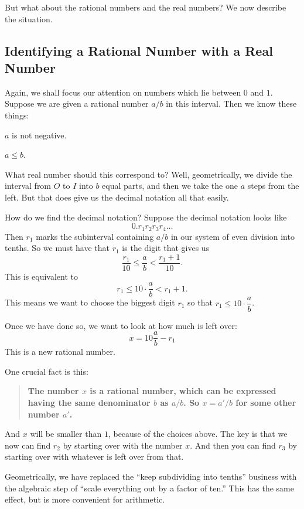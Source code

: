 \documentclass[12pt,letterpaper]{article}
\theoremstyle{definition}
\begin{document}
But what about the rational numbers and the real numbers?
We now describe the situation.

\subsection*{Identifying a Rational Number with a Real Number}

Again, we shall focus our attention on numbers which lie between $0$ and $1$.
Suppose we are given a rational number $a/b$ in this interval.
Then we know these things:
\begin{compactitem}
\item $a$ is not negative.
\item $a \leq b$.
\end{compactitem}
What real number should this correspond to?
Well, geometrically, we divide the interval from $O$ to $I$ into $b$ equal parts, and then we take the one $a$ steps from the left.
But that does give us the decimal notation all that easily.

How do we find the decimal notation?
Suppose the decimal notation looks like 
\[
0.r_1r_2r_3r_4\ldots
\]
Then $r_1$ marks the subinterval containing $a/b$ in our system of even division into tenths.
So we must have that $r_1$ is the digit that gives us
\[
\dfrac{r_1}{10} \leq \dfrac{a}{b} < \dfrac{r_1 + 1}{10}.
\]
This is equivalent to 
\[
r_1 \leq 10\cdot \dfrac{a}{b} < r_1 + 1.
\]
This means we want to choose the biggest digit $r_1$ so that $r_1 \leq 10 \cdot\dfrac{a}{b}$.

Once we have done so, we want to look at how much is left over: 
\[
x = 10\dfrac{a}{b} - r_1
\]
This is a new rational number. 

One crucial fact is this:
\begin{quote}
\textbf{The number $x$ is a rational number, which can be expressed having the same denominator $b$ as $a/b$.
So $x = a'/b$ for some other number $a'$.}
\end{quote}

And $x$ will be smaller than $1$, because of the choices above.
The key is that we now can find $r_2$ by starting over with the number $x$.
And then you can find $r_3$ by starting over with whatever is left over from that.

Geometrically, we have replaced the ``keep subdividing into tenths'' business with the algebraic step of ``scale everything out by a factor of ten.'' This has the same effect, but is more convenient for arithmetic.
\end{document}
